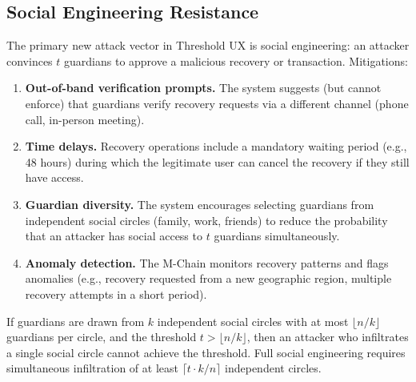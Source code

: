 \subsection{Social Engineering Resistance}

The primary new attack vector in Threshold UX is social engineering:
an attacker convinces $t$ guardians to approve a malicious recovery
or transaction. Mitigations:

\begin{enumerate}
    \item \textbf{Out-of-band verification prompts.} The system suggests
    (but cannot enforce) that guardians verify recovery requests via a
    different channel (phone call, in-person meeting).

    \item \textbf{Time delays.} Recovery operations include a mandatory
    waiting period (e.g., 48 hours) during which the legitimate user can
    cancel the recovery if they still have access.

    \item \textbf{Guardian diversity.} The system encourages selecting
    guardians from independent social circles (family, work, friends)
    to reduce the probability that an attacker has social access to
    $t$ guardians simultaneously.

    \item \textbf{Anomaly detection.} The M-Chain monitors recovery
    patterns and flags anomalies (e.g., recovery requested from a new
    geographic region, multiple recovery attempts in a short period).
\end{enumerate}

\begin{proposition}
If guardians are drawn from $k$ independent social circles with at most
$\lfloor n/k \rfloor$ guardians per circle, and the threshold $t > \lfloor n/k \rfloor$,
then an attacker who infiltrates a single social circle cannot achieve
the threshold. Full social engineering requires simultaneous infiltration
of at least $\lceil t \cdot k / n \rceil$ independent circles.
\end{proposition}

